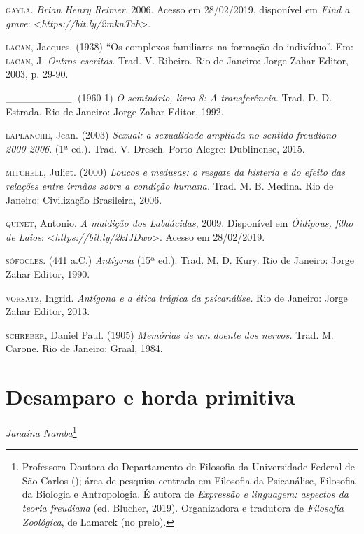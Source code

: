\begin{Parskip}
\textsc{gayla}. \emph{Brian Henry Reimer}, 2006. Acesso em 28/02/2019,
disponível em \emph{Find a grave}: \textless{}\emph{https://bit.ly/2mknTah}\textgreater{}.

\textsc{lacan}, Jacques. (1938) ``Os complexos familiares na formação do indivíduo''.
Em: \textsc{lacan}, J. \emph{Outros escritos}. Trad. V. Ribeiro. Rio
de Janeiro: Jorge Zahar Editor, 2003, p. 29-90.

\_\_\_\_\_\_\_\_\_. (1960-1) \emph{O seminário, livro 8: A transferência}. Trad. D. D. Estrada. Rio de Janeiro: Jorge Zahar Editor, 1992.

\textsc{laplanche}, Jean. (2003) \emph{Sexual: a sexualidade ampliada no
sentido freudiano 2000-2006}. (1ª ed.). Trad. V. Dresch. Porto Alegre:
Dublinense, 2015.

\textsc{mitchell}, Juliet. (2000) \emph{Loucos e medusas: o resgate da histeria
e do efeito das relações entre irmãos sobre a condição humana.} Trad. M. B.
Medina. Rio de Janeiro: Civilização Brasileira, 2006. 

\textsc{quinet}, Antonio. \emph{A maldição dos Labdácidas}, 2009. Disponível em \emph{Óidipous, filho de Laios}: \textless{}\emph{https://bit.ly/2kIJDwo}\textgreater{}. Acesso em
28/02/2019.

\textsc{sófocles}. (441 a.C.) \emph{Antígona} (15ª ed.). Trad. M. D. Kury.
Rio de Janeiro: Jorge Zahar Editor, 1990.

\textsc{vorsatz}, Ingrid. \emph{Antígona e a ética trágica da psicanálise.}
Rio de Janeiro: Jorge Zahar Editor, 2013.

\textsc{schreber}, Daniel Paul. (1905) \emph{Memórias de um doente dos nervos.}
Trad. M. Carone. Rio de Janeiro: Graal, 1984. \enlargethispage{\baselineskip}
\end{Parskip}


\chapter*{Desamparo e horda primitiva}

\begin{flushright}
\emph{Janaína Namba}\footnote{Professora Doutora do Departamento de Filosofia da Universidade
Federal de São Carlos (); área de pesquisa centrada em Filosofia da
Psicanálise, Filosofia da Biologia e Antropologia. É autora de \emph{Expressão e
linguagem: aspectos da teoria freudiana} (ed. Blucher, 2019). Organizadora e
tradutora de \emph{Filosofia Zoológica}, de  Lamarck (no prelo).}
\end{flushright}


